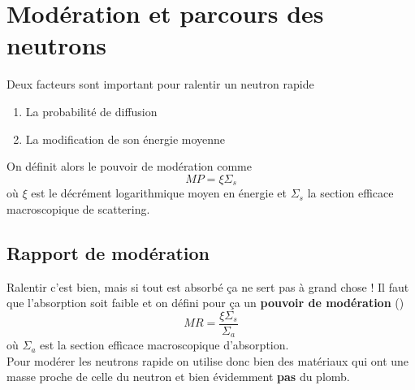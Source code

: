\section{Modération et parcours des neutrons} %
Deux facteurs sont important pour ralentir un neutron rapide
\begin{enumerate}
\item La probabilité de diffusion
\item La modification de son énergie moyenne
\end{enumerate}
On définit alors le pouvoir de modération comme
\begin{equation}
MP=\xi\Sigma_s
\end{equation}
où $\xi$ est le décrément logarithmique moyen en énergie et $\Sigma_s$ la section efficace 
macroscopique de scattering.

\subsection{Rapport de modération}
Ralentir c'est bien, mais si tout est absorbé ça ne sert pas à grand chose ! Il faut que 
l'absorption soit faible et on défini pour ça un \textbf{pouvoir de modération} (\danger)
\begin{equation}
MR=\frac{\xi\Sigma_s}{\Sigma_a}
\end{equation}
où $\Sigma_a$ est la section efficace macroscopique d'absorption.\\

Pour modérer les neutrons rapide on utilise donc bien des matériaux qui ont une masse proche
de celle du neutron et bien évidemment \textbf{pas} du plomb.